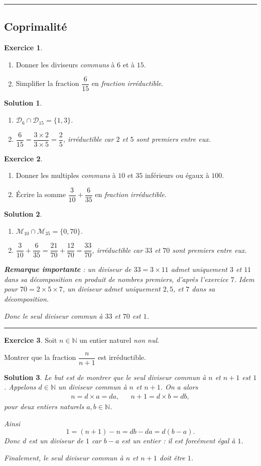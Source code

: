 \documentclass[a4paper, 14pt]{extarticle}
\theoremstyle{plain}
\newtheorem*{sol}{Solution}
\theoremstyle{definition}
\newtheorem{ex}{Exercice}
\newcommand{\N}{\mathbb{N}}
\newcommand{\exe}[2]{
		\begin{ex} #1  \end{ex}
		\begin{sol} #2 \end{sol}
	}
\newcommand{\exe}[2]{
		\begin{ex} #1  \end{ex}
	}
\begin{document}
\hrule

\subsection*{Coprimalité}


\exe{
	\begin{enumerate}
		\item Donner les diviseurs \emph{communs} à $6$ et à $15$.
		\item Simplifier la fraction $\dfrac{6}{15}$ en \emph{fraction irréductible}.
	\end{enumerate}
}{

	\begin{enumerate}
		\item $\mathcal{D}_6 \cap \mathcal{D}_{15} = \{ 1, 3 \}$.
		\item $\dfrac{6}{15} = \dfrac{3 \times 2}{3 \times 5} = \dfrac25$, irréductible car $2$ et $5$ sont premiers entre eux. 
	\end{enumerate}
	
}


\exe{
	\begin{enumerate}
		\item Donner les multiples \emph{communs}  à $10$ et $35$ inférieurs ou égaux à $100$.
		\item Écrire la somme $\dfrac{3}{10} + \dfrac{6}{35}$ en \emph{fraction irréductible}.
	\end{enumerate}
}{
	\begin{enumerate}
		\item $\mathcal{M}_{10} \cap \mathcal{M}_{35} = \{ 0, 70 \}$.
		\item  $\dfrac{3}{10} + \dfrac{6}{35} = \dfrac{21}{70} + \dfrac{12}{70} = \dfrac{33}{70}$, irréductible car $33$ et $70$ sont premiers entre eux.
	\end{enumerate}
	
	\textbf{Remarque importante} : un diviseur de $33 = 3 \times 11$ admet uniquement $3$ et $11$ dans sa décomposition en produit de nombres premiers, d'après l'exercice $7$.
	Idem pour $70 = 2 \times 5 \times 7$, un diviseur admet uniquement $2, 5$, et $7$ dans sa décomposition.
	
	Donc le seul diviseur commun à $33$ et $70$ est $1$.
}

\hrule

\exe{
	Soit $n \in \N$ un entier naturel \emph{non nul}.
	
	Montrer que la fraction $\dfrac{n}{n+1}$ est irréductible.
}{

	Le but est de montrer que le seul diviseur commun à $n$ et $n+1$ est $1$.
	Appelons $d \in \N$ un diviseur commun à $n$ et $n+1$.
	On a alors
		\begin{align*}
			n = d \times a = da,    &&  n+1 = d \times b = db,
		\end{align*}
	pour deux entiers naturels $a, b \in \N$.
	
	Ainsi
		\[ 1 = (n+1) - n = d b - d a = d(b-a). \]
	Donc $d$ est un diviseur de $1$ car $b-a$ est un entier : il est forcément égal à $1$.
	
	Finalement, le seul diviseur commun à $n$ et $n+1$ doit être $1$.
}
\end{document}
